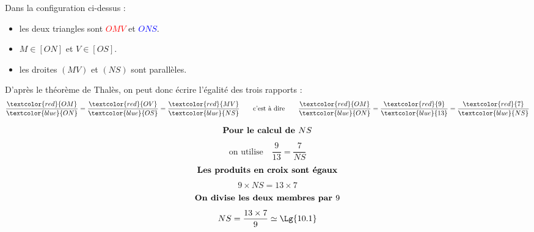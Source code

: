 \begin{methode*1}
            \correction
            Dans la configuration ci-dessus : 
            \begin{itemize}
                \item les deux triangles sont \textcolor{red}{$OMV$} et \textcolor{blue}{$ONS$}.
                \item $M \in [ON]$ et $V \in [OS]$.
                \item les droites $(MV)$ et $(NS)$ sont parallèles.                
            \end{itemize}
            D'après le théorème de Thalès, on peut donc écrire l'égalité des trois rapports :
            $$\frac{\textcolor{red}{OM}}{\textcolor{blue}{ON}}=\frac{\textcolor{red}{OV}}{\textcolor{blue}{OS}}=\frac{\textcolor{red}{MV}}{\textcolor{blue}{NS}}\qquad\mbox{c'est à dire}\qquad\frac{\textcolor{red}{OM}}{\textcolor{blue}{ON}}=\frac{\textcolor{red}{9}}{\textcolor{blue}{13}}=\frac{\textcolor{red}{7}}{\textcolor{blue}{NS}}$$

                $$\mbox{\bf Pour le calcul de $NS$}$$
                $$\mbox{on utilise} \quad \dfrac{9}{13}=\dfrac{7}{NS}$$
                $$\mbox{\bf Les produits en croix sont égaux}$$                
                $$9\times NS=13\times7$$
                $$\mbox{\bf On divise les deux membres par $9$}$$
                $$NS=\frac{13\times7}{9}\simeq\Lg{10.1}$$
        \end{methode*1}